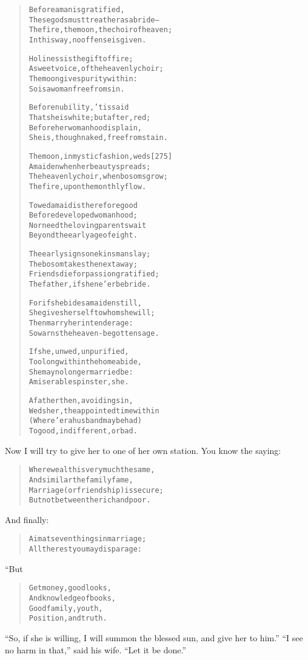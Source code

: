 \documentclass[article, twoside, 14pt]{memoir}
\renewenvironment{verbatim}{%
\begin{quote}%
\vskip -10pt%
\begin{alltt}\normalfont\large}{\end{alltt}%
\end{quote}%
\vskip -10pt
} %
\begin{document}
\begin{verbatim}
Before a man is gratified,
These gods must treat her as a bride--
The fire, the moon, the choir of heaven;
In this way, no offense is given.

Holiness is the gift of fire;
A sweet voice, of the heavenly choir;
The moon gives purity within:
So is a woman free from sin.

Before nubility, 'tis said
That she is white; but after, red;
Before her womanhood is plain,
She is, though naked, free from stain.

The moon, in mystic fashion, weds                       [275]
A maiden when her beauty spreads;
The heavenly choir, when bosoms grow;
The fire, upon the monthly flow.

To wed a maid is therefore good
Before developed womanhood;
Nor need the loving parents wait
Beyond the early age of eight.

The early signs one kinsman slay;
The bosom takes the next away;
Friends die for passion gratified;
The father, if she ne'er be bride.

For if she bides a maiden still,
She gives herself to whom she will;
Then marry her in tender age:
So warns the heaven-begotten sage.

If she, unwed, unpurified,
Too long within the home abide,
She may no longer married be:
A miserable spinster, she.

A father then, avoiding sin,
Weds her, the appointed time within
(Where'er a husband may be had)
To good, indifferent, or bad.
\end{verbatim}
Now I will try to give her to one of her own station. You know the
saying:

\begin{verbatim}
Where wealth is very much the same,
And similar the family fame,
Marriage (or friendship) is secure;
But not between the rich and poor.
\end{verbatim}
And finally:

\begin{verbatim}
Aim at seven things in marriage;
All the rest you may disparage:
\end{verbatim}
“But

\begin{verbatim}
Get money, good looks,
And knowledge of books,
Good family, youth,
Position, and truth.
\end{verbatim}
``So, if she is willing, I will summon the blessed sun, and give her to him.''
``I see no harm in that,'' said his wife. ``Let it be done.''
\end{document}
